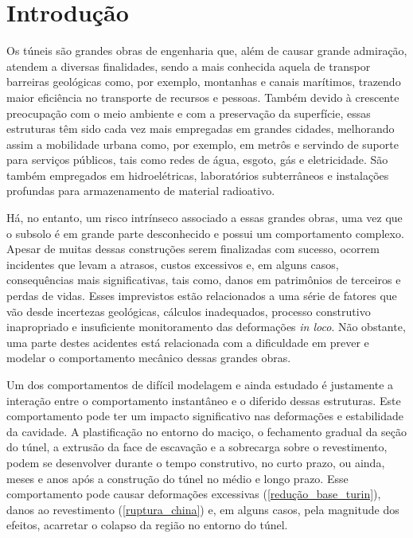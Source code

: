 \chapter{Introdução}\label{introducao}

Os túneis são grandes obras de engenharia que, além de causar grande admiração, atendem a diversas finalidades, sendo a mais conhecida aquela de transpor barreiras geológicas como, por exemplo, montanhas e canais marítimos, trazendo maior eficiência no transporte de recursos e pessoas. Também devido à crescente preocupação com o meio ambiente e com a preservação da superfície, essas estruturas têm sido cada vez mais empregadas em grandes cidades, melhorando assim a mobilidade urbana como, por exemplo, em metrôs e servindo de suporte para serviços públicos, tais como redes de água, esgoto, gás e eletricidade. São também empregados em hidroelétricas, laboratórios subterrâneos e instalações profundas para armazenamento de material radioativo.

Há, no entanto, um risco intrínseco associado a essas grandes obras, uma vez que o subsolo é em grande parte desconhecido e possui um comportamento complexo. Apesar de muitas dessas construções serem finalizadas com sucesso, ocorrem incidentes que levam a atrasos, custos excessivos e, em alguns casos, consequências mais significativas, tais como, danos em patrimônios de terceiros e perdas de vidas. Esses imprevistos estão relacionados a uma série de fatores que vão desde incertezas geológicas, cálculos inadequados, processo construtivo inapropriado e insuficiente monitoramento das deformações \textit{in loco}. Não obstante, uma parte destes acidentes está relacionada com a dificuldade em prever e modelar o comportamento mecânico dessas grandes obras.

Um dos comportamentos de difícil modelagem e ainda estudado é justamente a interação entre o comportamento instantâneo e o diferido dessas estruturas. Este comportamento pode ter um impacto significativo nas deformações e estabilidade da cavidade. A plastificação no entorno do maciço, o fechamento gradual da seção do túnel, a extrusão da face de escavação e a sobrecarga sobre o revestimento, podem se desenvolver durante o tempo construtivo, no curto prazo, ou ainda, meses e anos após a construção do túnel no médio e longo prazo. Esse comportamento pode causar deformações excessivas (\autoref{redução_base_turin}), danos ao revestimento (\autoref{ruptura_china}) e, em alguns casos, pela magnitude dos efeitos, acarretar o colapso da região no entorno do túnel.

